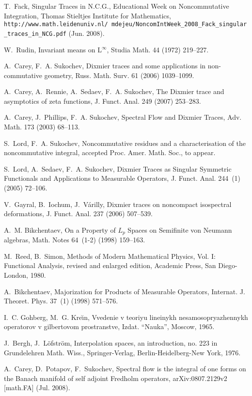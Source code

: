 \documentclass[final,1p]{elsarticle}
\numberwithin{equation}{section}
\theoremstyle{plain}
\theoremstyle{definition}
\begin{document}
\begin{thebibliography}{10}
T.~Fack,
 {{Singular {T}races in {N}.{C}.{G}.}}, Educational Week on
  Noncommutative Integration, Thomas Stieltjes Institute for Mathematics,
  {\texttt{{http://www.math.leidenuniv.nl/~mdejeu/NoncomIntWeek_2008_Fack_singular_traces_in_NCG.pdf}}} (Jun. 2008).

W.~Rudin, Invariant means on {L}$^\infty$, Studia Math. 44 (1972) 219--227.

A.~Carey, F.~A. Sukochev, Dixmier traces and some applications in
  non-commutative geometry, Russ. Math. Surv. 61 (2006) 1039--1099.

A.~Carey, A.~Rennie, A.~Sedaev, F.~A. Sukochev, The {D}ixmier trace and
  asymptotics of zeta functions, J. Funct. Anal. 249 (2007) 253--283.

A.~Carey, J.~Phillips, F.~A. Sukochev, Spectral {F}low and {D}ixmier {T}races,
  Adv. Math. 173 (2003) 68--113.

S.~Lord, F.~A. Sukochev, {Noncommutative
  residues and a characterisation of the noncommutative integral},
  accepted Proc. Amer. Math. Soc., to appear.

S.~Lord, A.~Sedaev, F.~A. Sukochev, {D}ixmier {T}races as {S}ingular
  {S}ymmetric {F}unctionals and {A}pplications to {M}easurable {O}perators, J.
  Funct. Anal. 244~(1) (2005) 72--106.

V.~Gayral, B.~Iochum, J.~V{\'{a}}rilly, Dixmier traces on noncompact
  isospectral deformations, J. Funct. Anal. 237 (2006) 507--539.

A.~M. Bikchentaev, On a {P}roperty of ${L}_p$ {S}paces on {S}emifinite von
  {N}eumann algebras, Math. Notes 64~(1-2) (1998) 159--163.

M.~Reed, B.~Simon, Methods of Modern Mathematical Physics, Vol. I: Functional
  Analysis, revised and enlarged edition, Academic Press, San Diego-London,
  1980.

A.~Bikchentaev, {Majorization for Products of Measurable Operators}, Internat.
  J. Theoret. Phys. 37~(1) (1998) 571--576.

I.~C. Gohberg, M.~G. Kre{\u\i}n, Vvedenie v teoriyu lineinykh
  nesamosopryazhennykh operatorov v gilbertovom prostranstve, Izdat. ``Nauka'',
  Moscow, 1965.

J.~Bergh, J.~L{\"{o}}fstr{\"{o}}m, Interpolation spaces, an introduction, no.
  223 in Grundelehren Math. Wiss., Springer-Verlag, Berlin-Heidelberg-New York,
  1976.

A.~Carey, D.~Potapov, F.~Sukochev,
  {{Spectral flow is the integral of one
  forms on the {B}anach manifold of self adjoint {F}redholm operators}},
  {{arXiv:0807.2129v2}} [math.FA] (Jul.
  2008).

\end{thebibliography}
\end{document}
